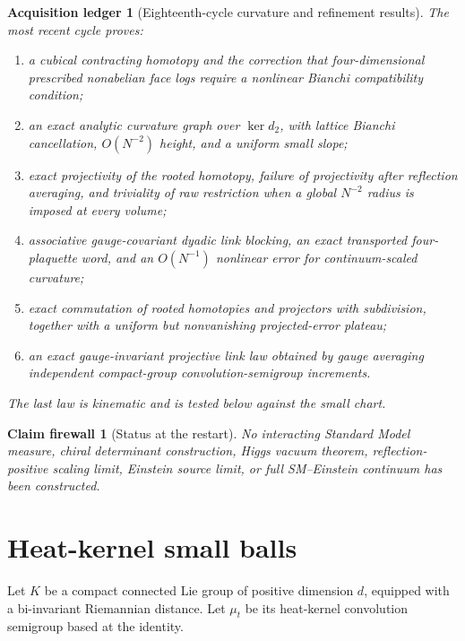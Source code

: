 \documentclass[11pt]{article}
\newtheorem{firewall}[theorem]{Claim firewall}
\newtheorem{ledger}[theorem]{Acquisition ledger}
\theoremstyle{remark}
\begin{document}
\begin{ledger}[Eighteenth-cycle curvature and refinement results]
\label{led:v19v1-curvature}
The most recent cycle proves:
\begin{enumerate}
\item a cubical contracting homotopy and the correction that
      four-dimensional prescribed nonabelian face logs require a nonlinear
      Bianchi compatibility condition;
\item an exact analytic curvature graph over \(\ker d_2\), with lattice
      Bianchi cancellation, \(O(N^{-2})\) height, and a uniform small slope;
\item exact projectivity of the rooted homotopy, failure of projectivity
      after reflection averaging, and triviality of raw restriction when a
      global \(N^{-2}\) radius is imposed at every volume;
\item associative gauge-covariant dyadic link blocking, an exact
      transported four-plaquette word, and an \(O(N^{-1})\) nonlinear error
      for continuum-scaled curvature;
\item exact commutation of rooted homotopies and projectors with
      subdivision, together with a uniform but nonvanishing projected-error
      plateau;
\item an exact gauge-invariant projective link law obtained by gauge
      averaging independent compact-group convolution-semigroup increments.
\end{enumerate}
The last law is kinematic and is tested below against the small chart.
\end{ledger}

\begin{firewall}[Status at the restart]
\label{fire:v19v1-status}
No interacting Standard Model measure, chiral determinant construction,
Higgs vacuum theorem, reflection-positive scaling limit, Einstein source
limit, or full SM--Einstein continuum has been constructed.
\end{firewall}

\section{Heat-kernel small balls}
\label{sec:v19v1-small-balls}

Let \(K\) be a compact connected Lie group of positive dimension \(d\),
equipped with a bi-invariant Riemannian distance.  Let \(\mu_t\) be its
heat-kernel convolution semigroup based at the identity.
\end{document}
